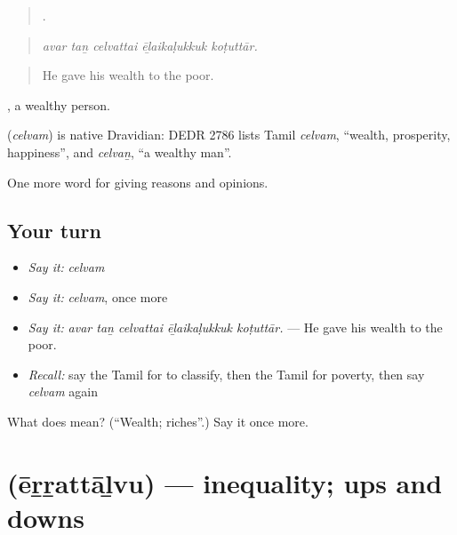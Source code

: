 \begin{quote}
    .
\end{quote}

\begin{quote}
\emph{avar taṉ celvattai ēḻaikaḷukkuk koṭuttār.}
\end{quote}

\begin{quote}
He gave his wealth to the poor.
\end{quote}

, a wealthy person.

\begin{cousinweb}
\textbf{} (\emph{celvam}) is native Dravidian: DEDR 2786 lists Tamil \emph{celvam}, \textquotedblleft{}wealth, prosperity, happiness\textquotedblright{}, and \emph{celvaṉ}, \textquotedblleft{}a wealthy man\textquotedblright{}.
\end{cousinweb}

\begin{grammarlens}[title={What you've built}]
One more word for giving reasons and opinions.
\end{grammarlens}

\subsection*{Your turn}
\begin{itemize}
\raggedright
  \item \emph{Say it:} \emph{celvam}
  \item \emph{Say it:} \emph{celvam}, once more
  \item \emph{Say it:} \emph{avar taṉ celvattai ēḻaikaḷukkuk koṭuttār.} — He gave his wealth to the poor.
  \item \emph{Recall:} say the Tamil for to classify, then the Tamil for poverty, then say \emph{celvam} again
\end{itemize}

\begin{tcolorbox}[breakable,colback=teal!4,colframe=teal!35!black,title={Before you move on}]
What does  mean? (\textquotedblleft{}Wealth; riches\textquotedblright{}.) Say it once more.
\end{tcolorbox}
\section[\texorpdfstring{\ta{ஏற்றத்தாழ்வு} (ēṟṟattāḻvu)}{ஏற்றத்தாழ்வு (ēṟṟattāḻvu)}]{ (ēṟṟattāḻvu) — inequality; ups and downs}


